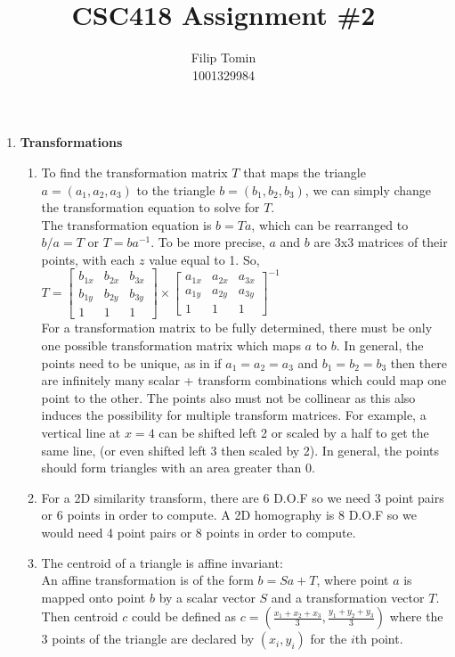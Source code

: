\documentclass[12pt]{article}
\title{CSC418 Assignment \#2\\}
\author{Filip Tomin\\
\normalsize{1001329984}}
\date{}
\begin{document}
\maketitle
\begin{enumerate}
\item \textbf{Transformations}
\begin{enumerate}
\item %
To find the transformation matrix $T$ that maps the triangle $a = (a_1,a_2,a_3)$ to the triangle $b = (b_1,b_2,b_3)$, we can simply change the transformation equation to solve for $T$.\\
The transformation equation is $b = Ta$, which can be rearranged to $b/a = T$ or $T = ba^{-1}$. To be more precise, $a$ and $b$ are 3x3 matrices of their points, with each $z$ value equal to 1. So,\\
$T = \begin{bmatrix}
b_{1x} & b_{2x} & b_{3x}\\
b_{1y} & b_{2y} & b_{3y}\\
1 & 1 & 1
\end{bmatrix}\times \begin{bmatrix}
a_{1x} & a_{2x} & a_{3x}\\
a_{1y} & a_{2y} & a_{3y}\\
1 & 1 & 1
\end{bmatrix}^{-1}$\\
For a transformation matrix to be fully determined, there must be only one possible transformation matrix which maps $a$ to $b$. In general, the points need to be unique, as in if $a_1 = a_2 = a_3$ and $b_1 = b_2 = b_3$ then there are infinitely many scalar + transform combinations which could map one point to the other. The points also must not be collinear as this also induces the possibility for multiple transform matrices. For example, a vertical line at $x = 4$ can be shifted left 2 or scaled by a half to get the same line, (or even shifted left 3 then scaled by 2). In general, the points should form triangles with an area greater than 0. 
\item %
For a 2D similarity transform, there are 6 D.O.F so we need 3 point pairs or 6 points in order to compute. A 2D homography is 8 D.O.F so we would need 4 point pairs or 8 points in order to compute.
\item %
The centroid of a triangle is affine invariant:\\
An affine transformation is of the form $b = Sa + T$, where point $a$ is mapped onto point $b$ by a scalar vector $S$ and a transformation vector $T$. Then centroid $c$ could be defined as $c = (\frac{x_1 + x_2 + x_3}{3}, \frac{y_1 + y_2 + y_3}{3})$ where the 3 points of the triangle are declared by $(x_i, y_i)$ for the $i$th point.

\end{enumerate}
\end{enumerate}
\end{document}
